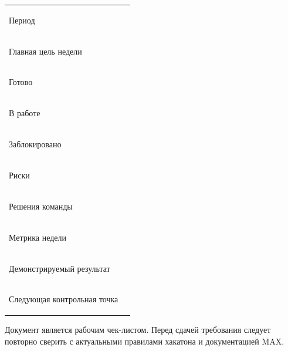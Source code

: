\documentclass[11pt,a4paper]{article}
\begin{document}
\begin{longtable}{>{\bfseries\raggedright\arraybackslash}p{48mm}>{\raggedright\arraybackslash}p{112mm}}
\toprule
Период & \rule{0pt}{9mm}\\
Главная цель недели & \rule{0pt}{9mm}\\
Готово & \rule{0pt}{9mm}\\
В работе & \rule{0pt}{9mm}\\
Заблокировано & \rule{0pt}{9mm}\\
Риски & \rule{0pt}{9mm}\\
Решения команды & \rule{0pt}{9mm}\\
Метрика недели & \rule{0pt}{9mm}\\
Демонстрируемый результат & \rule{0pt}{9mm}\\
Следующая контрольная точка & \rule{0pt}{9mm}\\
\bottomrule
\end{longtable}

\vfill
\begin{center}
\color{Muted}\small
Документ является рабочим чек-листом. Перед сдачей требования следует повторно сверить с актуальными правилами хакатона и документацией MAX.
\end{center}
\end{document}

